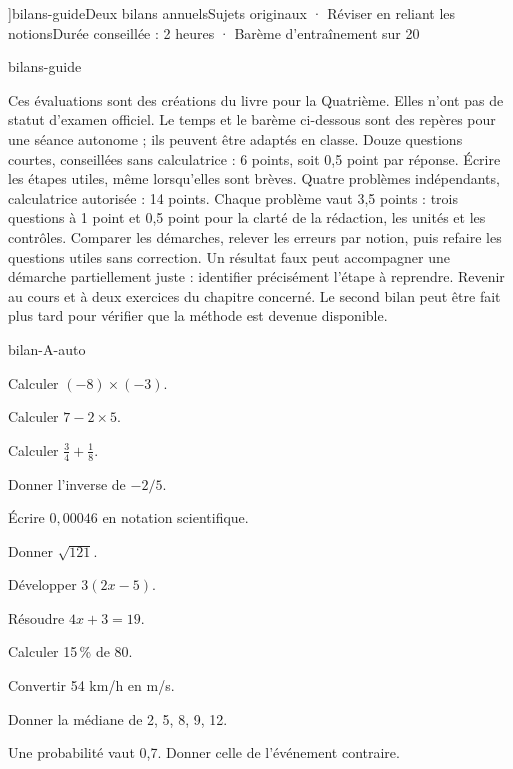 \editionPage[\pdfbookmark[0]{Deux bilans annuels}{bm-bilans-guide-parent}]{bilans-guide}{Deux bilans annuels}{Sujets originaux · Réviser en reliant les notions}{Durée conseillée : 2 heures · Barème d’entraînement sur 20}
\begin{blocEdition}{bilans-guide}

Ces évaluations sont des créations du livre pour la Quatrième. Elles n’ont
pas de statut d’examen officiel. Le temps et le barème ci-dessous sont des
repères pour une séance autonome ; ils peuvent être adaptés en classe.
Douze questions courtes, conseillées sans calculatrice : 6 points, soit
0,5 point par réponse. Écrire les étapes utiles, même lorsqu’elles sont brèves.
Quatre problèmes indépendants, calculatrice autorisée : 14 points.
Chaque problème vaut 3,5 points : trois questions à 1 point et 0,5 point
pour la clarté de la rédaction, les unités et les contrôles.
Comparer les démarches, relever les erreurs par notion, puis refaire
les questions utiles sans correction. Un résultat faux peut accompagner
une démarche partiellement juste : identifier précisément l’étape à reprendre.
Revenir au cours et à deux exercices du chapitre concerné. Le second
bilan peut être fait plus tard pour vérifier que la méthode est devenue disponible.

\end{blocEdition}
\begin{blocEdition}{bilan-A-auto}
\begin{questions}
\item Calculer $(-8)\times(-3)$.
\item Calculer $7-2\times5$.
\item Calculer $\frac34+\frac18$.
\item Donner l’inverse de $-2/5$.
\item Écrire $0{,}00046$ en notation scientifique.
\item Donner $\sqrt{121}$.
\item Développer $3(2x-5)$.
\item Résoudre $4x+3=19$.
\item Calculer 15\,\% de 80.
\item Convertir 54 km/h en m/s.
\item Donner la médiane de 2, 5, 8, 9, 12.
\item Une probabilité vaut 0,7. Donner celle de l’événement contraire.\end{questions}
\end{blocEdition}
